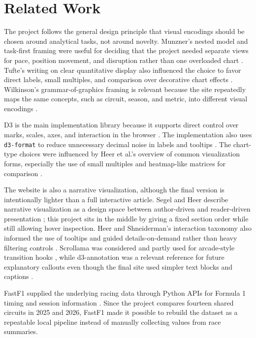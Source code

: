 \documentclass[conference]{IEEEtran}
\begin{document}
\section{Related Work}
The project follows the general design principle that visual encodings should be chosen around analytical tasks, not around novelty. Munzner's nested model and task-first framing were useful for deciding that the project needed separate views for pace, position movement, and disruption rather than one overloaded chart \cite{munzner2014visualization}. Tufte's writing on clear quantitative display also influenced the choice to favor direct labels, small multiples, and comparison over decorative chart effects \cite{tufte2001visual}. Wilkinson's grammar-of-graphics framing is relevant because the site repeatedly maps the same concepts, such as circuit, season, and metric, into different visual encodings \cite{wilkinson2005grammar}.

D3 is the main implementation library because it supports direct control over marks, scales, axes, and interaction in the browser \cite{bostock2011d3,d3docs}. The implementation also uses \texttt{d3-format} to reduce unnecessary decimal noise in labels and tooltips \cite{d3formatdocs}. The chart-type choices were influenced by Heer et al.'s overview of common visualization forms, especially the use of small multiples and heatmap-like matrices for comparison \cite{heer2010zoo}.

The website is also a narrative visualization, although the final version is intentionally lighter than a full interactive article. Segel and Heer describe narrative visualization as a design space between author-driven and reader-driven presentation \cite{segel2010narrative}; this project sits in the middle by giving a fixed section order while still allowing hover inspection. Heer and Shneiderman's interaction taxonomy also informed the use of tooltips and guided details-on-demand rather than heavy filtering controls \cite{heer2012interactive}. Scrollama was considered and partly used for arcade-style transition hooks \cite{scrollama}, while d3-annotation was a relevant reference for future explanatory callouts even though the final site used simpler text blocks and captions \cite{d3annotation}.

FastF1 supplied the underlying racing data through Python APIs for Formula 1 timing and session information \cite{fastf1docs}. Since the project compares fourteen shared circuits in 2025 and 2026, FastF1 made it possible to rebuild the dataset as a repeatable local pipeline instead of manually collecting values from race summaries.
\end{document}
